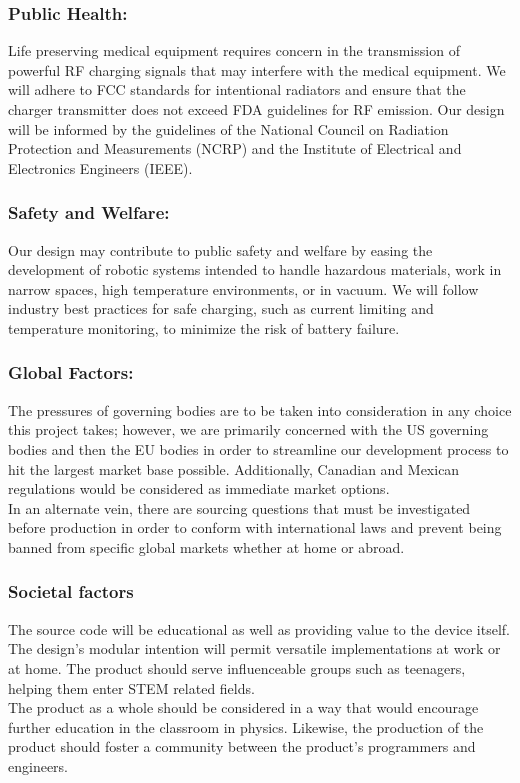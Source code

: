 \documentclass[12pt]{article}
\begin{document}
\subsubsection{Public Health:}
Life preserving medical equipment requires concern in the transmission of powerful RF charging signals that may interfere with the medical equipment. We will adhere to FCC standards for intentional radiators and ensure that the charger transmitter does not exceed FDA guidelines for RF emission. Our design will be informed by the guidelines of the National Council on Radiation Protection and Measurements (NCRP) and the Institute of Electrical and Electronics Engineers (IEEE).
 
\subsubsection{Safety and Welfare:}
Our design may contribute to public safety and welfare by easing the development of robotic systems intended to handle hazardous materials, work in narrow spaces, high temperature environments, or in vacuum. We will follow industry best practices for safe charging, such as current limiting and temperature monitoring, to minimize the risk of battery failure.

\pagebreak

\subsubsection{Global Factors:}
The pressures of governing bodies are to be taken into consideration in any choice this project takes; however, we are primarily concerned with the US governing bodies and then the EU bodies in order to streamline our development process to hit the largest market base possible.  Additionally, Canadian and Mexican regulations would be considered as immediate market options.\\
In an alternate vein, there are sourcing questions that must be investigated before production in order to conform with international laws and prevent being banned from specific global markets whether at home or abroad.

\subsubsection{Societal factors}
The source code will be educational as well as providing value to the device itself.  The design's modular intention will permit versatile implementations at work or at home.  The product should serve influenceable groups such as teenagers, helping them enter STEM related fields.\\
The product as a whole should be considered in a way that would encourage further education in the classroom in physics.  Likewise, the production of the product should foster a community between the product's programmers and engineers.
\end{document}
